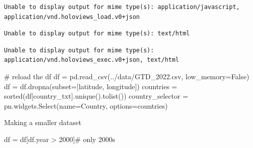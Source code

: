 \documentclass[
  letterpaper,
  DIV=11,
  numbers=noendperiod]{scrreprt}
\newenvironment{Shaded}{\begin{snugshade}}{\end{snugshade}}
\newcommand{\BuiltInTok}[1]{\textcolor[rgb]{0.00,0.23,0.31}{#1}}
\newcommand{\CommentTok}[1]{\textcolor[rgb]{0.37,0.37,0.37}{#1}}
\newcommand{\DecValTok}[1]{\textcolor[rgb]{0.68,0.00,0.00}{#1}}
\newcommand{\NormalTok}[1]{\textcolor[rgb]{0.00,0.23,0.31}{#1}}
\newcommand{\OperatorTok}[1]{\textcolor[rgb]{0.37,0.37,0.37}{#1}}
\newcommand{\StringTok}[1]{\textcolor[rgb]{0.13,0.47,0.30}{#1}}
\newcommand{\VariableTok}[1]{\textcolor[rgb]{0.07,0.07,0.07}{#1}}
\begin{document}
\begin{verbatim}
Unable to display output for mime type(s): application/javascript, application/vnd.holoviews_load.v0+json
\end{verbatim}

\begin{verbatim}
Unable to display output for mime type(s): text/html
\end{verbatim}

\begin{verbatim}
Unable to display output for mime type(s): application/vnd.holoviews_exec.v0+json, text/html
\end{verbatim}

\begin{Shaded}
\begin{Highlighting}[]
\CommentTok{\# reload the df}
\NormalTok{df }\OperatorTok{=}\NormalTok{ pd.read\_csv(}\StringTok{\textquotesingle{}../data/GTD\_2022.csv\textquotesingle{}}\NormalTok{, low\_memory}\OperatorTok{=}\VariableTok{False}\NormalTok{)}
\NormalTok{df }\OperatorTok{=}\NormalTok{ df.dropna(subset}\OperatorTok{=}\NormalTok{[}\StringTok{\textquotesingle{}latitude\textquotesingle{}}\NormalTok{, }\StringTok{\textquotesingle{}longitude\textquotesingle{}}\NormalTok{])}
\NormalTok{countries }\OperatorTok{=} \BuiltInTok{sorted}\NormalTok{(df[}\StringTok{\textquotesingle{}country\_txt\textquotesingle{}}\NormalTok{].unique().tolist())}
\NormalTok{country\_selector }\OperatorTok{=}\NormalTok{ pn.widgets.Select(name}\OperatorTok{=}\StringTok{\textquotesingle{}Country\textquotesingle{}}\NormalTok{, options}\OperatorTok{=}\NormalTok{countries)}
\end{Highlighting}
\end{Shaded}

\begin{Shaded}
\begin{Highlighting}[]
\NormalTok{Making a smaller dataset}
\end{Highlighting}
\end{Shaded}

\begin{Shaded}
\begin{Highlighting}[]
\NormalTok{df }\OperatorTok{=}\NormalTok{ df[df.year }\OperatorTok{\textgreater{}} \DecValTok{2000}\NormalTok{]}\CommentTok{\# only 2000s}
\end{Highlighting}
\end{Shaded}
\end{document}
